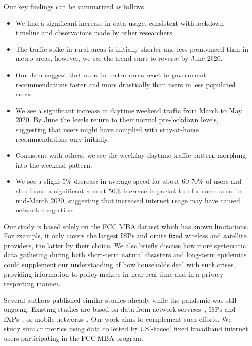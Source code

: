 \documentclass[conference,10pt]{IEEEtran}
\begin{document}
Our key findings can be summarized as follows.
\begin{itemize}
    \item We find a significant increase in data usage, consistent with lockdown timeline and observations made by other researchers.
    \item The traffic spike in rural areas is initially shorter and less pronounced than in metro areas, however, we see the trend start to reverse by June 2020.
    \item Our data suggest that users in metro areas react to government recommendations faster and more drastically than users in less populated areas.
    \item We see a significant increase in daytime weekend traffic from March to May 2020. By June the levels return to their normal pre-lockdown levels, suggesting that users might have complied with stay-at-home recommendations only initially.
    \item Consistent with others, we see the weekday daytime traffic pattern morphing into the weekend pattern.
    \item We see a slight 5\% decrease in average speed for about 60-70\% of users and also found a significant almost 50\% increase in packet loss for some users in mid-March 2020, suggesting that increased internet usage may have caused network congestion.
\end{itemize}

Our study is based solely on the \gls{FCC} \gls{MBA} dataset which has known limitations. For example, it only covers the largest \glspl{ISP} and omits fixed wireless and satellite providers, the latter by their choice. We also briefly discuss how more systematic data gathering during both short-term natural disasters and long-term epidemics could supplement our understanding of how households deal with such crises, providing information to policy makers in near real-time and in a privacy-respecting manner.

Several authors published similar studies already while the pandemic was still ongoing. Existing studies are based on data from network services~\cite{bottger2020internet,akamai,facebook}, \glspl{ISP} and \glspl{IXP}~\cite{feldmann2020lockdown,liu2020characterizing}, or mobile networks~\cite{lutu2020characterization}. Our work aims to complement such efforts. We study similar metrics using data collected by \gls{US}[-based] fixed broadband internet users participating in the \gls{FCC} \gls{MBA} program.
\end{document}
